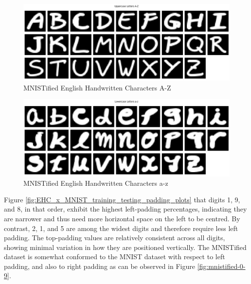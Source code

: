
\begin{figure}[ht]
    \centering
    \includegraphics[width=0.99\columnwidth]{Figures/Results/HandwrittenCharacters/mnistified-A-Z.png}
    \caption{MNISTified English Handwritten Characters A-Z}
\label{fig:mnistified-A-Z}
\end{figure}



\begin{figure}[ht]
    \centering
    \includegraphics[width=0.99\columnwidth]{Figures/Results/HandwrittenCharacters/mnistified-a-z.png}
    \caption{MNISTified English Handwritten Characters a-z}
\label{fig:mnistified-a-z}
\end{figure}



Figure \ref{fig:EHC_x_MNIST_training_testing_padding_plots} that digits 1, 9, and 8, in that order, exhibit the highest left-padding percentages, indicating they are narrower and thus need more horizontal space on the left to be centred. By contrast, 2, 1, and 5 are among the widest digits and therefore require less left padding. The top-padding values are relatively consistent across all digits, showing minimal variation in how they are positioned vertically. The MNISTified dataset is somewhat conformed to the MNIST dataset with respect to left padding, and also to right padding as can be observed in Figure \ref{fig:mnistified-0-9}.

